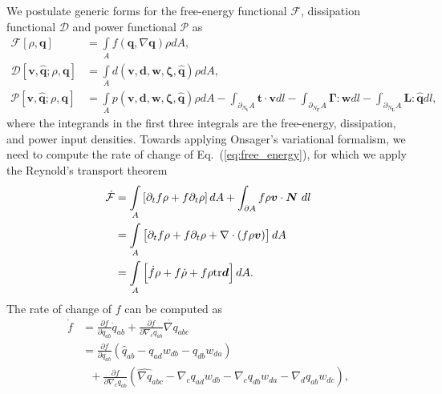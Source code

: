 We postulate generic forms for the free-energy functional $\mathcal{F}$, dissipation functional $\mathcal{D}$ and power functional $\mathcal{P}$ as
\begin{align}
	\mathcal{F}\left[\rho,\bm{q}\right] &= \underset{A}{\int} f(\bm{q},\nabla\bm{q}) \rho dA, \label{eq:free_energy}\\
	\mathcal{D}\left[\bm{v},\widehat{\bm{q}}; \rho,\bm{q}\right] &= \underset{A}{\int} d(\bm{v},\bm{d},\bm{w},\bm{\zeta},\widehat{\bm{q}}) \rho dA,\\
	\mathcal{P}\left[\bm{v},\widehat{\bm{q}}; \rho,\bm{q}\right] &= \underset{A}{\int} p(\bm{v},\bm{d},\bm{w},\bm{\zeta},\widehat{\bm{q}}) \rho dA - \int_{\partial_{N_{\bm{t}}} A} \bm{t} \cdot \bm{v} dl -  \int_{\partial_{N_{\bm{\Gamma}}} A} \bm{\Gamma}:\bm{w} dl -  \int_{\partial_{N_{\bm{L}}} A} \bm{L}:\widehat{\bm{q}} dl,
\end{align}
where the integrands in the first three integrals are the free-energy, dissipation, and power input densities. Towards applying Onsager's variational formalism, we need to compute the rate of change of Eq.~(\ref{eq:free_energy}), for which we apply the Reynold's transport theorem 
\begin{equation}
	\begin{aligned} \label{eq:change_of_free_energy}
		\dot{\mathcal{F}} &= \underset{A}{\int} \left[\partial_tf  \rho + f \partial_t{\rho} \right] dA + \int_{\partial A} f\rho \bm{v} \cdot\bm{N} ~dl\\
		&= \underset{A}{\int} \left[\partial_tf  \rho + f \partial_t{\rho}  + \nabla\cdot\left(f\rho \bm{v}\right) \right] dA\\
		&=\underset{A}{\int} \left[\dot{f}  \rho + f \dot{\rho}  + f\rho {\rm tr}\bm{d} \right] dA.
	\end{aligned}
\end{equation}
The rate of change of $f$ can be computed as
\begin{equation}
	\begin{aligned}
		\label{eq:dotfU}  
		\dot{f} &=  \frac{\partial f}{\partial q_{ab}} \dot{q}_{ab}+ \frac{\partial f}{\partial \nabla_c q_{ab}} \dot{\nabla q}_{abc}\\
		&= \frac{\partial f}{\partial q_{ab}}\left(\widehat{q}_{ab}- q_{ad} w_{db}- q_{db} w_{da}\right) \\
		&~~~+  \frac{\partial f}{\partial \nabla_c q_{ab}}\left(\widehat{\nabla q}_{abc}-\nabla_cq_{ad} w_{db}- \nabla_cq_{db} w_{da}- \nabla_d q_{ab} w_{dc} \right), 
	\end{aligned}
\end{equation}
